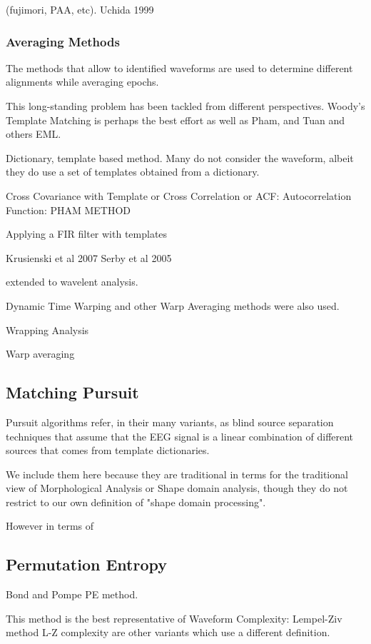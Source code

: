 \documentclass[sensors,article,submit,moreauthors,pdftex,10pt,a4paper]{mdpi}
\begin{document}
 (fujimori, PAA, etc).  Uchida 1999

\subsubsection{Averaging Methods}

The methods that allow to identified waveforms are used to determine different alignments while averaging epochs.

This long-standing problem has been tackled from different perspectives.  Woody's Template Matching is perhaps the best effort as well as Pham, and Tuan and others EML.

Dictionary, template based method.  Many do not consider the waveform, albeit they do use a set of templates obtained from a dictionary.

Cross Covariance with Template or Cross Correlation or ACF: Autocorrelation Function: PHAM METHOD

Applying a FIR filter with templates 

Krusienski et al 2007
Serby et al 2005

extended to wavelent analysis.

Dynamic Time Warping and other Warp Averaging methods were also used.

Wrapping Analysis

Warp averaging


\subsection{Matching Pursuit}

Pursuit algorithms refer, in their many variants, as blind source separation techniques that assume that the EEG signal is a linear combination of different sources that comes from template dictionaries.

We include them here because they are traditional in terms for the traditional view of Morphological Analysis or Shape domain analysis, though they do not restrict to our own definition of "shape domain processing".

However in terms of 


\subsection{Permutation Entropy}

Bond and Pompe PE method.

This method is the best representative of Waveform Complexity: Lempel-Ziv method L-Z complexity are other variants which use a different definition.
\end{document}

